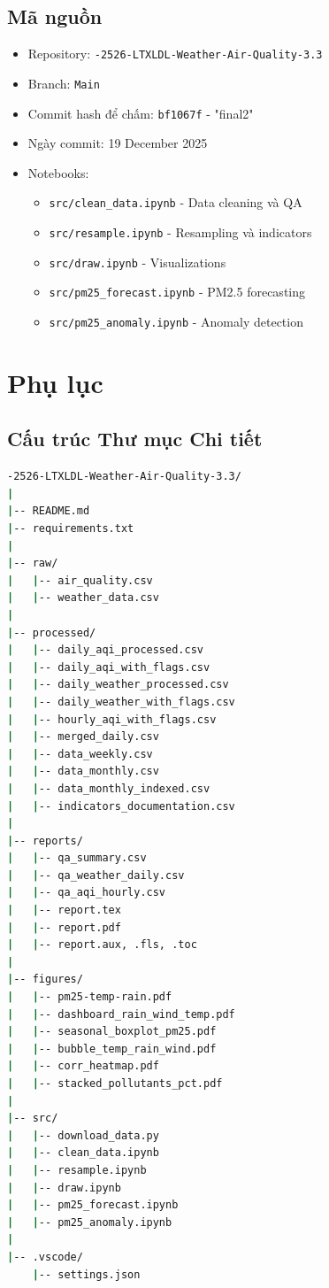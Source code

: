 \documentclass[12pt,a4paper]{article}
\begin{document}
\subsection{Mã nguồn}
\begin{itemize}
    \item Repository: \texttt{-2526-LTXLDL-Weather-Air-Quality-3.3}
    \item Branch: \texttt{Main}
    \item Commit hash để chấm: \texttt{bf1067f} - "final2"
    \item Ngày commit: 19 December 2025
    \item Notebooks:
    \begin{itemize}
        \item \texttt{src/clean\_data.ipynb} - Data cleaning và QA
        \item \texttt{src/resample.ipynb} - Resampling và indicators
        \item \texttt{src/draw.ipynb} - Visualizations
        \item \texttt{src/pm25\_forecast.ipynb} - PM2.5 forecasting
        \item \texttt{src/pm25\_anomaly.ipynb} - Anomaly detection
    \end{itemize}
\end{itemize}

\appendix
\section{Phụ lục}

\subsection{Cấu trúc Thư mục Chi tiết}

\begin{lstlisting}[language=bash, caption={Cau truc project hoan chinh}]
-2526-LTXLDL-Weather-Air-Quality-3.3/
|
|-- README.md
|-- requirements.txt
|
|-- raw/
|   |-- air_quality.csv
|   |-- weather_data.csv
|
|-- processed/
|   |-- daily_aqi_processed.csv
|   |-- daily_aqi_with_flags.csv
|   |-- daily_weather_processed.csv
|   |-- daily_weather_with_flags.csv
|   |-- hourly_aqi_with_flags.csv
|   |-- merged_daily.csv
|   |-- data_weekly.csv
|   |-- data_monthly.csv
|   |-- data_monthly_indexed.csv
|   |-- indicators_documentation.csv
|
|-- reports/
|   |-- qa_summary.csv
|   |-- qa_weather_daily.csv
|   |-- qa_aqi_hourly.csv
|   |-- report.tex
|   |-- report.pdf
|   |-- report.aux, .fls, .toc
|
|-- figures/
|   |-- pm25-temp-rain.pdf
|   |-- dashboard_rain_wind_temp.pdf
|   |-- seasonal_boxplot_pm25.pdf
|   |-- bubble_temp_rain_wind.pdf
|   |-- corr_heatmap.pdf
|   |-- stacked_pollutants_pct.pdf
|
|-- src/
|   |-- download_data.py
|   |-- clean_data.ipynb
|   |-- resample.ipynb
|   |-- draw.ipynb
|   |-- pm25_forecast.ipynb
|   |-- pm25_anomaly.ipynb
|
|-- .vscode/
    |-- settings.json
\end{lstlisting}
\end{document}
